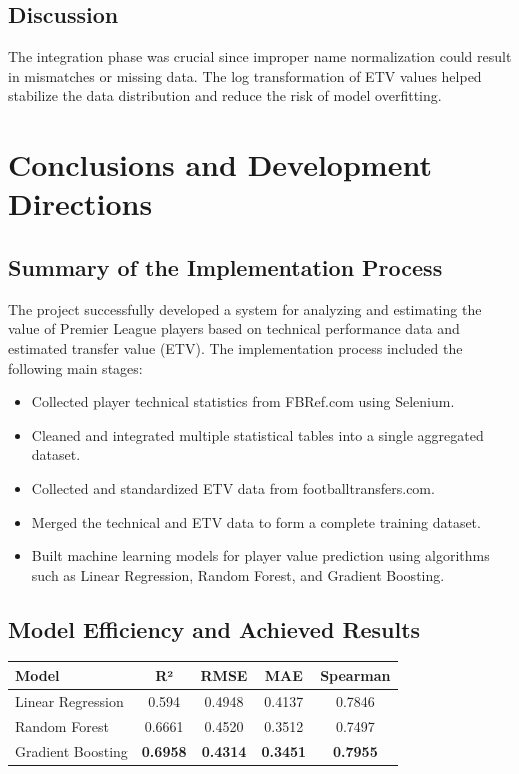 \documentclass[12pt,a4paper]{article}
\begin{document}
\subsection{Discussion}
The integration phase was crucial since improper name normalization could result in mismatches or missing data. The log transformation of ETV values helped stabilize the data distribution and reduce the risk of model overfitting.

\section{Conclusions and Development Directions}

\subsection{Summary of the Implementation Process}
The project successfully developed a system for analyzing and estimating the value of Premier League players based on technical performance data and estimated transfer value (ETV). The implementation process included the following main stages:
\begin{itemize}
    \item Collected player technical statistics from FBRef.com using Selenium.
    \item Cleaned and integrated multiple statistical tables into a single aggregated dataset.
    \item Collected and standardized ETV data from footballtransfers.com.
    \item Merged the technical and ETV data to form a complete training dataset.
    \item Built machine learning models for player value prediction using algorithms such as Linear Regression, Random Forest, and Gradient Boosting.
\end{itemize}

\subsection{Model Efficiency and Achieved Results}
\begin{tabular}{|l|c|c|c|c|}
\hline
\textbf{Model} & \textbf{R²} & \textbf{RMSE} & \textbf{MAE} & \textbf{Spearman} \\
\hline
Linear Regression & 0.594  & 0.4948 & 0.4137 &  0.7846  \\
Random Forest     & 0.6661 & 0.4520 & 0.3512  & 0.7497  \\
Gradient Boosting & \textbf{0.6958} & \textbf{0.4314} & \textbf{0.3451} & \textbf{0.7955} \\
\hline
\end{tabular}
\end{document}
